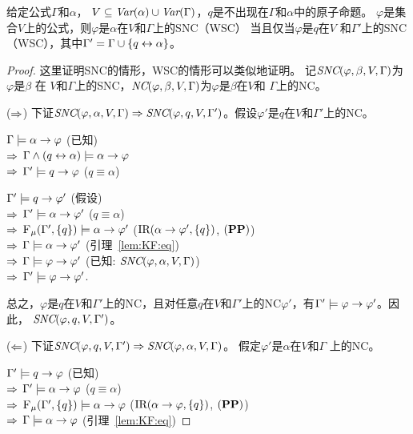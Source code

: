 \begin{proposition}\label{formulaNS_to_p}
	给定公式$\Gamma$和$\alpha$， $V \subseteq \textit{Var}(\alpha) \cup \textit{Var}(\Gamma)$，$q$是不出现在$\Gamma$和$\alpha$中的原子命题。
	$\varphi$是集合$V$上的公式，则$\varphi$是$\alpha$在$V$和$\Gamma$上的SNC（WSC） 当且仅当$\varphi$是$q$在$V$ 和$\Gamma'$上的SNC（WSC），其中$\Gamma' = \Gamma \cup \{q \leftrightarrow \alpha\}$。
\end{proposition}
\begin{proof}
	这里证明SNC的情形，WSC的情形可以类似地证明。
	记$\emph{SNC}(\varphi,\beta,V,\Gamma)$为$\varphi$是$\beta$ 在 $V$和$\Gamma$上的SNC，$\emph{NC}(\varphi,\beta,V,\Gamma)$为$\varphi$是$\beta$在$V$和 $\Gamma$上的NC。
	
	($\Rightarrow$) 下证$\emph{SNC}(\varphi,\alpha,V,\Gamma)\Rightarrow \emph{SNC}(\varphi,q,V,\Gamma')$。假设$\varphi'$是$q$在$V$和$\Gamma'$上的NC。
	
	$\Gamma \models \alpha \rightarrow \varphi$ \hfill  (已知)\\
	$\Rightarrow$ $\Gamma \wedge (q \leftrightarrow \alpha) \models \alpha \rightarrow \varphi$\\
	$\Rightarrow$ $\Gamma' \models q \rightarrow \varphi$  \hfill ($q \equiv \alpha$)
	
	$\Gamma' \models q \rightarrow \varphi'$ \hfill (假设) \\
	$\Rightarrow$ $\Gamma' \models \alpha \rightarrow \varphi'$ \hfill ($q \equiv \alpha$)\\
	$\Rightarrow$ ${\textsc{F}_{\textsc{$\mu$}}}(\Gamma', \{q\}) \models \alpha \rightarrow \varphi'$ \hfill ($\textrm{IR}(\alpha \rightarrow \varphi', \{q\})$, $(\textbf{PP})$)\\
	$\Rightarrow$ $\Gamma \models \alpha \rightarrow \varphi'$ \hfill  (引理~\ref{lem:KF:eq})\\
	$\Rightarrow$ $\Gamma \models \varphi \rightarrow \varphi'$ \hfill  (已知: $\emph{SNC}(\varphi,\alpha,V,\Gamma)$)\\
	$\Rightarrow$ $\Gamma' \models \varphi \rightarrow \varphi'$.
	
	总之，$\varphi$是$q$在$V$和$\Gamma'$上的NC，且对任意$q$在$V$和$\Gamma'$上的NC$\varphi'$，有$\Gamma' \models \varphi \rightarrow \varphi'$。因此， $\emph{SNC}(\varphi,q,V,\Gamma')$。
	
	($\Leftarrow$) 下证$\emph{SNC}(\varphi,q,V,\Gamma')\Rightarrow \emph{SNC}(\varphi,\alpha,V,\Gamma)$。 假定$\varphi'$是$\alpha$在$V$和$\Gamma$ 上的NC。
	
	$\Gamma' \models q \rightarrow \varphi$ \hfill  (已知)\\
	$\Rightarrow$  $\Gamma' \models \alpha \rightarrow \varphi$ \hfill  ($q \equiv \alpha$)\\
	$\Rightarrow$  ${\textsc{F}_{\textsc{$\mu$}}}(\Gamma', \{q\}) \models \alpha \rightarrow \varphi$ \hfill ($\textrm{IR}(\alpha \rightarrow \varphi, \{q\})$, $(\textbf{PP})$)\\
	$\Rightarrow$ $\Gamma \models \alpha \rightarrow \varphi$ \hfill  (引理~\ref{lem:KF:eq})
	

\end{proof}
